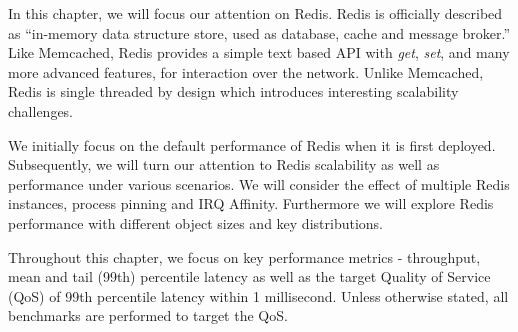 In this chapter, we will focus our attention on Redis. Redis is officially described as ``in-memory data structure store, used as database, cache and message broker.'' \cite{sanfilippo2009redis} Like Memcached, Redis provides a simple text based API with \textit{get}, \textit{set}, and many more advanced features, for interaction over the network. Unlike Memcached, Redis is single threaded by design which introduces interesting scalability challenges.

We initially focus on the default performance of Redis when it is first deployed. Subsequently, we will turn our attention to Redis scalability as well as performance under various scenarios. We will consider the effect of multiple Redis instances, process pinning and IRQ Affinity. Furthermore we will explore Redis performance with different object sizes and key distributions.

Throughout this chapter, we focus on key performance metrics - throughput, mean and tail (99th) percentile latency as well as the target Quality of Service (QoS) of 99th percentile latency within 1 millisecond. Unless otherwise stated, all benchmarks are performed to target the QoS.






